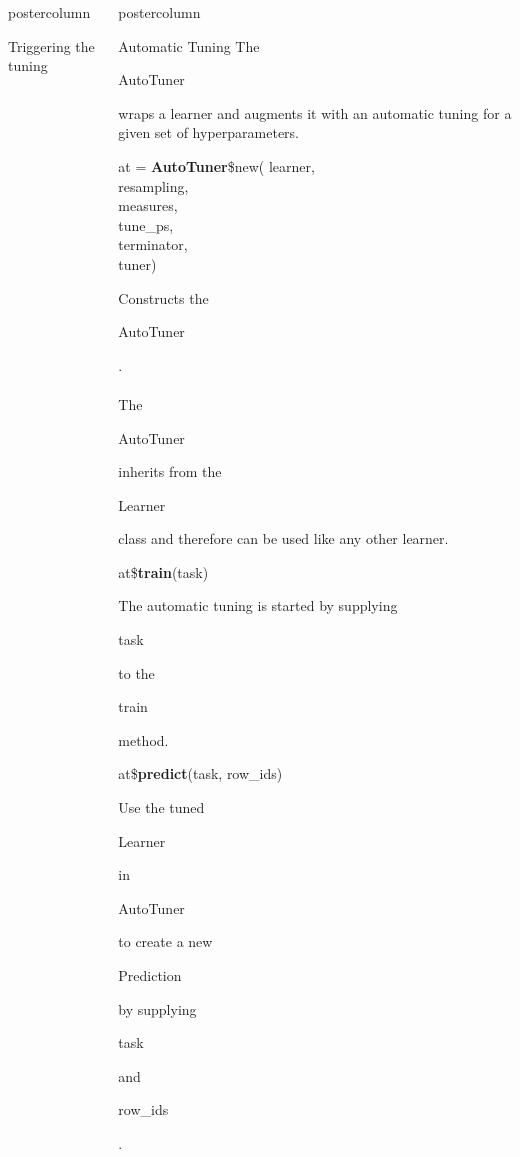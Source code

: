 \documentclass{beamer}
\newlength{\columnheight} %
\newcommand{\codeinline}[1]{\begin{codeboxinline}#1\end{codeboxinline}}
\begin{document}
\begin{frame}[fragile]{}
\begin{columns}
\begin{column}{.245\textwidth}
\begin{beamercolorbox}[center]{postercolumn}
\begin{minipage}{.98\textwidth}
{\begin{myblock}{Triggering the tuning}
						\end{myblock}
						\vfill}
				\end{minipage}
			\end{beamercolorbox}
		\end{column}
		\begin{column}{.245\textwidth}
			\begin{beamercolorbox}[center]{postercolumn}
				\begin{minipage}{.98\textwidth}
					\parbox[t][\columnheight]{\textwidth}{
						\begin{myblock}{Automatic Tuning}
							The \codeinline{AutoTuner} wraps a learner and augments it with an automatic tuning for a given set of hyperparameters.
							\\
							\begin{codeboxmultiline}[width=18cm]
								at = \textbf{AutoTuner}\$new(
								\hspace*{1ex}learner,\\
								\hspace*{1ex}resampling,\\
								\hspace*{1ex}measures,\\
								\hspace*{1ex}tune\_ps,\\
								\hspace*{1ex}terminator,\\
								\hspace*{1ex}tuner)
							\end{codeboxmultiline}
							Constructs the \codeinline{AutoTuner}.
							\\
							\\
							The \codeinline{AutoTuner} inherits from the \codeinline{Learner} class and therefore can be used like any other learner.
							\\
							\begin{codebox}
								at\$\textbf{train}(task)
							\end{codebox}
							The automatic tuning is started by supplying \codeinline{task} to the \codeinline{train} method.
							\\
							\begin{codebox}
								at\$\textbf{predict}(task, row\_ids)
							\end{codebox}
							Use the tuned \codeinline{Learner} in \codeinline{AutoTuner} to create a new \codeinline{Prediction} by supplying \codeinline{task} and \codeinline{row\_ids}.
							\\

\end{myblock}}
\end{minipage}
\end{beamercolorbox}
\end{column}
\end{columns}
\end{frame}
\end{document}
